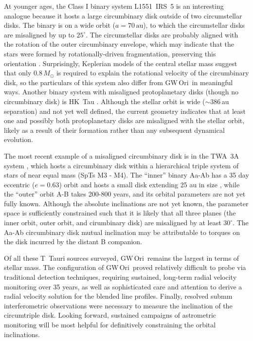 \documentclass[twocolumn]{aastex61}
\newcommand{\obj}{GW\,Ori}
\begin{document}
At younger ages, the Class I binary system L1551~IRS~5 is an interesting analogue because it hosts a large circumbinary disk \citep[$r\sim500$\,au, $M_\mathrm{disk} \approx 0.07 \,M_\odot$;][]{eisner12,takakuwa17} outside of two circumstellar disks. The binary is on a wide orbit ($a = 70\,\mathrm{au}$), to which the circumstellar disks are misaligned by up to $25^\circ$. The circumstellar disks are probably aligned with the rotation of the outer circumbinary envelope, which may indicate that the stars were formed by rotationally-driven fragmentation, preserving this orientation \citep{lim16}. Surprisingly, Keplerian models of the central stellar mass suggest that only $0.8\,M_\odot$ is required to explain the rotational velocity of the circumbinary disk, so the particulars of this system also differ from \obj\ in meaningful ways. Another binary system with misaligned protoplanetary disks (though no circumbinary disk) is HK~Tau \citep{jensen14}. Although the stellar orbit is wide ($\sim$386\,au separation) and not yet well defined, the current geometry indicates that at least one and possibly both protoplanetary disks are misaligned with the stellar orbit, likely as a result of their formation rather than any subsequent dynamical evolution.

The most recent example of a misaligned circumbinary disk is in the TWA~3A system \citep{kellog17}, which hosts a circumbinary disk within a hierarchical triple system of stars of near equal mass (SpTs M3 - M4). The ``inner'' binary Aa-Ab has a 35 day eccentric ($e=0.63$) orbit and hosts a small disk extending 25 au in size \citep{andrews10}, while the ``outer'' orbit A-B takes 200-800 years, and its orbital parameters are not yet fully known. Although the absolute inclinations are not yet known, the parameter space is sufficiently constrained such that it is likely that all three planes (the inner orbit, outer orbit, and cirumbinary disk) are misaligned by at least $30^\circ$. The Aa-Ab circumbinary disk mutual inclination may be attributable to torques on the disk incurred by the distant B companion.

Of all these T~Tauri sources surveyed, \obj\ remains the largest in terms of stellar mass. The configuration of \obj\ proved relatively difficult to probe via traditional detection techniques, requiring sustained, long-term radial velocity monitoring over 35 years, as well as sophisticated care and attention to derive a radial velocity solution for the blended line profiles. Finally, resolved submm interferometric observations were necessary to measure the inclination of the circumtriple disk. Looking forward, sustained campaigns of astrometric monitoring will be most helpful for definitively constraining the orbital inclinations.
\end{document}
